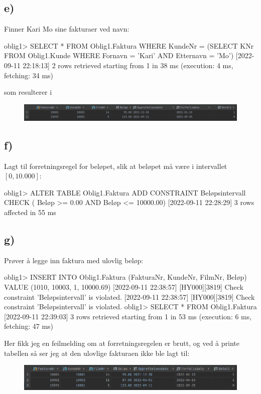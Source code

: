 \documentclass[%
notitlepage,
 amsmath,amssymb,
 aps,
rmp,
]{revtex4-2}  %
\begin{document}
\subsection*{e)}
Finner Kari Mo sine fakturaer ved navn:
\begin{sql}
oblig1> SELECT *
        FROM Oblig1.Faktura
        WHERE KundeNr = (SELECT KNr FROM Oblig1.Kunde WHERE Fornavn = 'Kari' AND Etternavn = 'Mo')
[2022-09-11 22:18:13] 2 rows retrieved starting from 1 in 38 ms (execution: 4 ms, fetching: 34 ms)
\end{sql}
som resulterer i
\begin{figure}[H]
\centering\includegraphics[width=\columnwidth]{op2e.png}
\end{figure}

\subsection*{f)}
Lagt til forretningsregel for beløpet, slik at beløpet må være i intervallet \(\left[0, 10.000\right]\):
\begin{sql}
oblig1> ALTER TABLE Oblig1.Faktura
            ADD CONSTRAINT Beløpsintervall
            CHECK ( Beløp >= 0.00 AND Beløp <= 10000.00)
[2022-09-11 22:28:29] 3 rows affected in 55 ms
\end{sql}

\subsection*{g)}
Prøver å legge inn faktura med ulovlig beløp:
\begin{sql}
oblig1> INSERT INTO Oblig1.Faktura (FakturaNr, KundeNr, FilmNr, Beløp)
        VALUE (1010, 10003, 1, 10000.69)
[2022-09-11 22:38:57] [HY000][3819] Check constraint 'Beløpsintervall' is violated.
[2022-09-11 22:38:57] [HY000][3819] Check constraint 'Beløpsintervall' is violated.
oblig1> SELECT *
        FROM Oblig1.Faktura
[2022-09-11 22:39:03] 3 rows retrieved starting from 1 in 53 ms (execution: 6 ms, fetching: 47 ms)
\end{sql}
Her fikk jeg en feilmelding om at forretningsregelen er brutt, og ved å printe tabellen så ser jeg at den ulovlige fakturaen ikke ble lagt til:
\begin{figure}[H]
\centering\includegraphics[width=\columnwidth]{op2f.png}
\end{figure}
\end{document}
